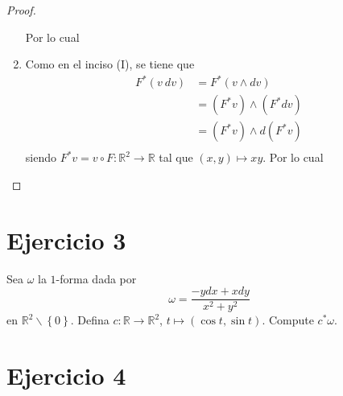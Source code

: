 \documentclass[12pt]{report}
\theoremstyle{largebreak}
\newcommand\cf[3]{\ensuremath{#1:#2\rightarrow#3}}
\begin{document}
\begin{proof}
\begin{enumerate}
            Por lo cual

            
            \item Como en el inciso (I), se tiene que
            \begin{equation*}
                \begin{split}
                    F^*(v\: dv)&=F^*(v\wedge dv)\\
                    &=(F^*v)\wedge (F^*dv)\\
                    &=(F^*v)\wedge d(F^*v)\\
                \end{split}
            \end{equation*}
            siendo $F^*v=\cf{v\circ F}{\mathbb{R}^2}{\mathbb{R}}$ tal que $(x,y)\mapsto xy$. Por lo cual
        \end{enumerate}
    \end{proof}

    \newpage

    \section{Ejercicio 3}

    \begin{excer}
        Sea $\omega$ la $1$-forma dada por
        \begin{equation*}
            \omega = \frac{-ydx+xdy}{x^2+y^2}
        \end{equation*}
        en $\mathbb{R}^2\backslash\left\{0\right\}$. Defina $\cf{c}{\mathbb{R}}{\mathbb{R}^2}$, $t\mapsto (\cos t,\sin t)$. Compute $c^*\omega$.
    \end{excer}

    \newpage

    \renewcommand{\theenumi}{\alph{enumi}}
    \renewcommand{\labelenumi}{{(\theenumi)}}

    \section{Ejercicio 4}
\end{document}
